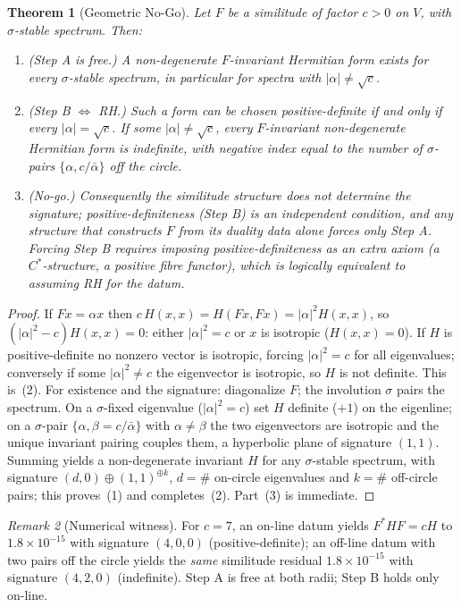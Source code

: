 \documentclass[11pt,reqno]{amsart}
\theoremstyle{plain}
\newtheorem{theorem}{Theorem}
\theoremstyle{definition}
\theoremstyle{remark}
\newtheorem{remark}[theorem]{Remark}
\begin{document}
\begin{theorem}[Geometric No-Go]\label{thm:B}
Let $F$ be a similitude of factor $c>0$ on $V$, with $\sigma$-stable spectrum. Then:
\begin{enumerate}
\item\emph{(Step A is free.)} A non-degenerate $F$-invariant Hermitian form exists for \emph{every}
$\sigma$-stable spectrum, in particular for spectra with $|\alpha|\neq\sqrt c$.
\item\emph{(Step B $\Leftrightarrow$ RH.)} Such a form can be chosen positive-definite if and only if every
$|\alpha|=\sqrt c$. If some $|\alpha|\neq\sqrt c$, every $F$-invariant non-degenerate Hermitian form is
indefinite, with negative index equal to the number of $\sigma$-pairs $\{\alpha,c/\bar\alpha\}$ off the
circle.
\item\emph{(No-go.)} Consequently the similitude structure does not determine the signature;
positive-definiteness (Step B) is an independent condition, and any structure that constructs $F$ from its
duality data alone forces only Step A. Forcing Step B requires imposing positive-definiteness as an extra
axiom (a $C^*$-structure, a positive fibre functor), which is logically equivalent to assuming RH for the
datum.
\end{enumerate}
\end{theorem}

\begin{proof}
If $Fx=\alpha x$ then $c\,H(x,x)=H(Fx,Fx)=|\alpha|^2H(x,x)$, so $(|\alpha|^2-c)H(x,x)=0$: either
$|\alpha|^2=c$ or $x$ is isotropic ($H(x,x)=0$). If $H$ is positive-definite no nonzero vector is isotropic,
forcing $|\alpha|^2=c$ for all eigenvalues; conversely if some $|\alpha|^2\neq c$ the eigenvector is
isotropic, so $H$ is not definite. This is~(2). For existence and the signature: diagonalize $F$; the
involution $\sigma$ pairs the spectrum. On a $\sigma$-fixed eigenvalue ($|\alpha|^2=c$) set $H$ definite
($+1$) on the eigenline; on a $\sigma$-pair $\{\alpha,\beta=c/\bar\alpha\}$ with $\alpha\neq\beta$ the two
eigenvectors are isotropic and the unique invariant pairing couples them, a hyperbolic plane of signature
$(1,1)$. Summing yields a non-degenerate invariant $H$ for any $\sigma$-stable spectrum, with signature
$(d,0)\oplus(1,1)^{\oplus k}$, $d=\#$ on-circle eigenvalues and $k=\#$ off-circle pairs; this proves~(1) and
completes~(2). Part~(3) is immediate.
\end{proof}

\begin{remark}[Numerical witness]
For $c=7$, an on-line datum yields $F^*HF=cH$ to $1.8\times10^{-15}$ with signature $(4,0,0)$
(positive-definite); an off-line datum with two pairs off the circle yields the \emph{same} similitude
residual $1.8\times10^{-15}$ with signature $(4,2,0)$ (indefinite). Step A is free at both radii; Step B holds
only on-line.
\end{remark}
\end{document}
